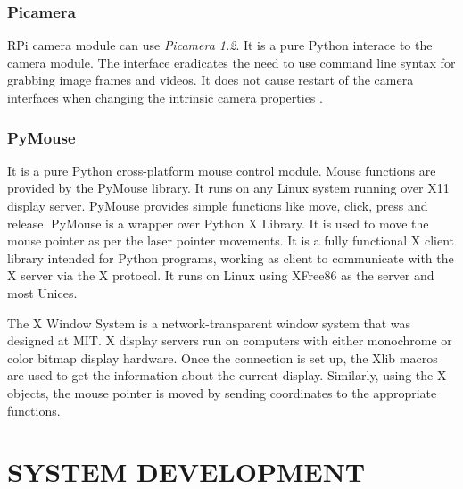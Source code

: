 \documentclass[12pt, a4paper]{article}
\begin{document}
\subsubsection{ Picamera}

RPi camera module can use \emph{Picamera 1.2}. It is a pure Python interace to the camera module. The interface eradicates the need to use command line syntax for grabbing image frames and videos. It does not cause restart of the camera interfaces when changing the intrinsic camera properties
. 
\subsubsection{ PyMouse}
It is a pure Python cross-platform mouse control module. Mouse functions are provided by the PyMouse library. It runs on any Linux system running over X11 display server. PyMouse provides simple functions like move, click, press and release. PyMouse is a wrapper over Python X Library. It is used to move the mouse pointer as per the laser pointer movements. It is a fully functional X client library intended for Python programs, working as client to communicate with the X server via the X protocol. It runs on Linux using XFree86 as the server and most Unices.


The X Window System is a network-transparent window system that was designed at MIT. X display servers run on computers with either monochrome or color bitmap display hardware. Once the connection is set up, the Xlib macros are used to get the information about the current display. Similarly, using the X objects, the mouse pointer is moved by sending coordinates to the appropriate functions. 


\newpage
\section{SYSTEM DEVELOPMENT}
\end{document}

